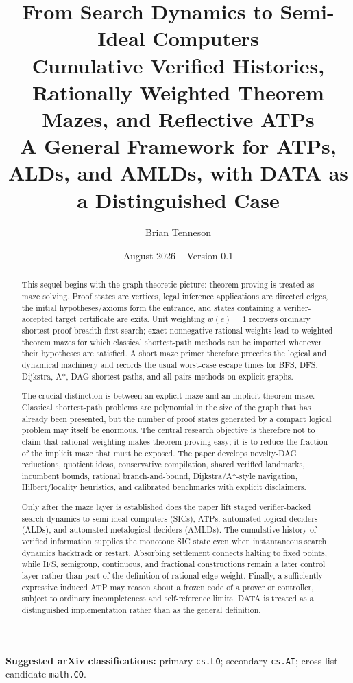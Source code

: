 \documentclass[11pt]{article}
\title{\textbf{From Search Dynamics to Semi-Ideal Computers}\\[0.4em]
\Large Cumulative Verified Histories, Rationally Weighted Theorem Mazes, and Reflective ATPs\\[0.6em]
\large A General Framework for ATPs, ALDs, and AMLDs, with DATA as a Distinguished Case}
\author{Brian Tenneson}
\date{August 2026 -- Version 0.1}
\theoremstyle{remark}
\begin{document}
\maketitle

\begin{center}
\textbf{Suggested arXiv classifications:} primary \texttt{cs.LO}; secondary \texttt{cs.AI}; cross-list candidate \texttt{math.CO}.
\end{center}

\begin{abstract}
This sequel begins with the graph-theoretic picture: theorem proving is treated as maze solving. Proof states are vertices, legal inference applications are directed edges, the initial hypotheses/axioms form the entrance, and states containing a verifier-accepted target certificate are exits. Unit weighting $w(e)=1$ recovers ordinary shortest-proof breadth-first search; exact nonnegative rational weights lead to weighted theorem mazes for which classical shortest-path methods can be imported whenever their hypotheses are satisfied. A short maze primer therefore precedes the logical and dynamical machinery and records the usual worst-case escape times for BFS, DFS, Dijkstra, A*, DAG shortest paths, and all-pairs methods on explicit graphs.

The crucial distinction is between an explicit maze and an implicit theorem maze. Classical shortest-path problems are polynomial in the size of the graph that has already been presented, but the number of proof states generated by a compact logical problem may itself be enormous. The central research objective is therefore not to claim that rational weighting makes theorem proving easy; it is to reduce the fraction of the implicit maze that must be exposed. The paper develops novelty-DAG reductions, quotient ideas, conservative compilation, shared verified landmarks, incumbent bounds, rational branch-and-bound, Dijkstra/A*-style navigation, Hilbert/locality heuristics, and calibrated benchmarks with explicit disclaimers.

Only after the maze layer is established does the paper lift staged verifier-backed search dynamics to semi-ideal computers (SICs), ATPs, automated logical deciders (ALDs), and automated metalogical deciders (AMLDs). The cumulative history of verified information supplies the monotone SIC state even when instantaneous search dynamics backtrack or restart. Absorbing settlement connects halting to fixed points, while IFS, semigroup, continuous, and fractional constructions remain a later control layer rather than part of the definition of rational edge weight. Finally, a sufficiently expressive induced ATP may reason about a frozen code of a prover or controller, subject to ordinary incompleteness and self-reference limits. DATA is treated as a distinguished implementation rather than as the general definition.
\end{abstract}

\tableofcontents
\clearpage








\end{document}
